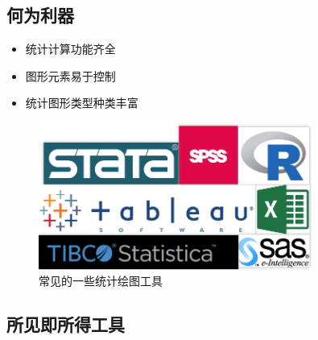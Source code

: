 \documentclass{beamerthemeMono}
\begin{document}
\subsection{何为利器}
\begin{frame}[t]{\subsecname}
  \begin{itemize}
     \item 统计计算功能齐全
     \item 图形元素易于控制
     \item 统计图形类型种类丰富
  \end{itemize}

\begin{figure}[ht]
  \centering \includegraphics[width=0.8\textwidth]{stat_tools.png}
  \caption{常见的一些统计绘图工具}
\end{figure}

\end{frame}

\subsection{所见即所得工具}
\end{document}
